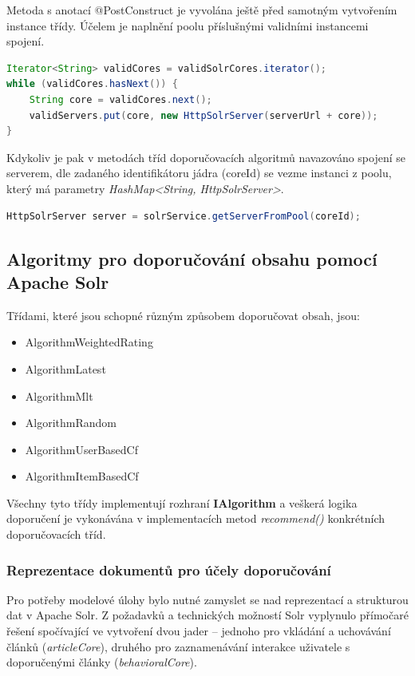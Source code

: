 \documentclass[thesis=M,czech]{FITthesis}[2014/05/07]
\begin{document}
Metoda s anotací @PostConstruct je vyvolána ještě před samotným vytvořením instance třídy. Účelem je naplnění poolu příslušnými validními instancemi spojení.

\begin{lstlisting}[language=java]
Iterator<String> validCores = validSolrCores.iterator();
while (validCores.hasNext()) {
    String core = validCores.next();
    validServers.put(core, new HttpSolrServer(serverUrl + core));
}
\end{lstlisting}

Kdykoliv je pak v metodách tříd doporučovacích algoritmů navazováno spojení se serverem, dle zadaného identifikátoru jádra (coreId) se vezme instanci z poolu, který má parametry \emph{HashMap<String, HttpSolrServer>}. 

\begin{lstlisting}[language=java]
HttpSolrServer server = solrService.getServerFromPool(coreId);
\end{lstlisting}

\subsection{Algoritmy pro doporučování obsahu pomocí Apache Solr}
\label{sec:alg}
Třídami, které jsou schopné různým způsobem doporučovat obsah, jsou:

\begin{itemize}
	\item AlgorithmWeightedRating
	\item AlgorithmLatest
	\item AlgorithmMlt
	\item AlgorithmRandom
	\item AlgorithmUserBasedCf
	\item AlgorithmItemBasedCf				
\end{itemize}

Všechny tyto třídy implementují rozhraní \textbf{IAlgorithm} a veškerá logika doporučení je vykonávána v implementacích metod \emph{recommend()} konkrétních doporučovacích tříd.

\subsubsection{Reprezentace dokumentů pro účely doporučování}

Pro potřeby modelové úlohy bylo nutné zamyslet se nad reprezentací a strukturou dat v Apache Solr. Z požadavků a technických možností Solr vyplynulo přímočaré řešení spočívající ve vytvoření dvou jader – jednoho pro vkládání a uchovávání článků (\emph{articleCore}), druhého pro zaznamenávání interakce uživatele s doporučenými články (\emph{behavioralCore}). 
\end{document}
